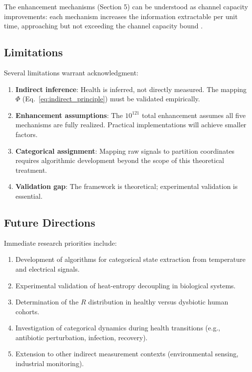 \documentclass[twocolumn,10pt]{article}
\begin{document}
The enhancement mechanisms (Section 5) can be understood as channel capacity improvements: each mechanism increases the information extractable per unit time, approaching but not exceeding the channel capacity bound \cite{cover2006}.

\subsection{Limitations}

Several limitations warrant acknowledgment:

\begin{enumerate}
    \item \textbf{Indirect inference}: Health is inferred, not directly measured. The mapping $\Phi$ (Eq.~\ref{eq:indirect_principle}) must be validated empirically.

    \item \textbf{Enhancement assumptions}: The $10^{121}$ total enhancement assumes all five mechanisms are fully realized. Practical implementations will achieve smaller factors.

    \item \textbf{Categorical assignment}: Mapping raw signals to partition coordinates requires algorithmic development beyond the scope of this theoretical treatment.

    \item \textbf{Validation gap}: The framework is theoretical; experimental validation is essential.
\end{enumerate}

\subsection{Future Directions}

Immediate research priorities include:

\begin{enumerate}
    \item Development of algorithms for categorical state extraction from temperature and electrical signals.

    \item Experimental validation of heat-entropy decoupling in biological systems.

    \item Determination of the $R$ distribution in healthy versus dysbiotic human cohorts.

    \item Investigation of categorical dynamics during health transitions (e.g., antibiotic perturbation, infection, recovery).

    \item Extension to other indirect measurement contexts (environmental sensing, industrial monitoring).
\end{enumerate}
\end{document}
